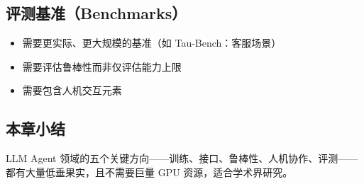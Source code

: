 \subsection{评测基准（Benchmarks）}

\begin{itemize}
    \item 需要更实际、更大规模的基准（如 Tau-Bench：客服场景）
    \item 需要评估鲁棒性而非仅评估能力上限
    \item 需要包含人机交互元素
\end{itemize}

\subsection{本章小结}

LLM Agent 领域的五个关键方向——训练、接口、鲁棒性、人机协作、评测——都有大量低垂果实，且不需要巨量 GPU 资源，适合学术界研究。

